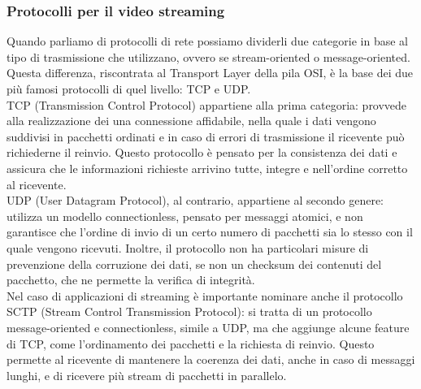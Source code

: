 		\subsubsection{Protocolli per il video streaming}
			Quando parliamo di protocolli di rete possiamo dividerli due categorie in base al tipo di trasmissione che utilizzano, ovvero se stream-oriented o message-oriented. Questa differenza, riscontrata al Transport Layer della pila OSI, è la base dei due più famosi protocolli di quel livello: TCP e UDP.\@
			\\
			TCP (Transmission Control Protocol) appartiene alla prima categoria: provvede alla realizzazione dei una connessione affidabile, nella quale i dati vengono suddivisi in pacchetti ordinati e in caso di errori di trasmissione il ricevente può richiederne il reinvio. Questo protocollo è pensato per la consistenza dei dati e assicura che le informazioni richieste arrivino tutte, integre e nell'ordine corretto al ricevente.
			\\
			UDP (User Datagram Protocol), al contrario, appartiene al secondo genere: utilizza un modello connectionless, pensato per messaggi atomici, e non garantisce che l'ordine di invio di un certo numero di pacchetti sia lo stesso con il quale vengono ricevuti. Inoltre, il protocollo non ha particolari misure di prevenzione della corruzione dei dati, se non un checksum dei contenuti del pacchetto, che ne permette la verifica di integrità.
			\\
			Nel caso di applicazioni di streaming è importante nominare anche il protocollo SCTP (Stream Control Transmission Protocol): si tratta di un protocollo message-oriented e connectionless, simile a UDP, ma che aggiunge alcune feature di TCP, come l'ordinamento dei pacchetti e la richiesta di reinvio. Questo permette al ricevente di mantenere la coerenza dei dati, anche in caso di messaggi lunghi, e di ricevere più stream di pacchetti in parallelo.

